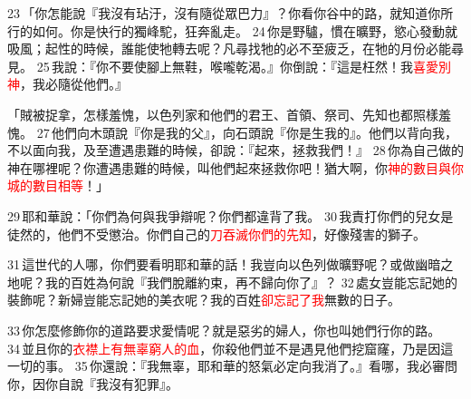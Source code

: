 23 「你怎能說『我沒有玷汙，沒有隨從眾巴力』？你看你谷中的路，就知道你所行的如何。你是快行的獨峰駝，狂奔亂走。 24 你是野驢，慣在曠野，慾心發動就吸風；起性的時候，誰能使牠轉去呢？凡尋找牠的必不至疲乏，在牠的月份必能尋見。 25 我說：『你不要使腳上無鞋，喉嚨乾渴。』你倒說：『這是枉然！我\textcolor{red}{喜愛別神}，我必隨從他們。』

「賊被捉拿，怎樣羞愧，以色列家和他們的君王、首領、祭司、先知也都照樣羞愧。 27 他們向木頭說『你是我的父』，向石頭說『你是生我的』。他們以背向我，不以面向我，及至遭遇患難的時候，卻說：『起來，拯救我們！』 28 你為自己做的神在哪裡呢？你遭遇患難的時候，叫他們起來拯救你吧！猶大啊，你\textcolor{red}{神的數目與你城的數目相等}！」

29 耶和華說：「你們為何與我爭辯呢？你們都違背了我。 30 我責打你們的兒女是徒然的，他們不受懲治。你們自己的\textcolor{red}{刀吞滅你們的先知}，好像殘害的獅子。 

31 這世代的人哪，你們要看明耶和華的話！我豈向以色列做曠野呢？或做幽暗之地呢？我的百姓為何說『我們脫離約束，再不歸向你了』？ 32 處女豈能忘記她的裝飾呢？新婦豈能忘記她的美衣呢？我的百姓\textcolor{red}{卻忘記了我}無數的日子。 

33 你怎麼修飾你的道路要求愛情呢？就是惡劣的婦人，你也叫她們行你的路。 34 並且你的\textcolor{red}{衣襟上有無辜窮人的血}，你殺他們並不是遇見他們挖窟窿，乃是因這一切的事。 35 你還說：『我無辜，耶和華的怒氣必定向我消了。』看哪，我必審問你，因你自說『我沒有犯罪』。 

